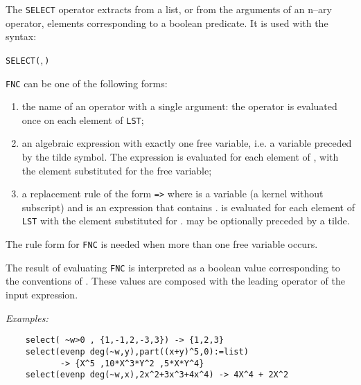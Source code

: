 The \texttt{SELECT} operator extracts from a list,
or from the arguments of an n--ary operator, elements corresponding
to a boolean predicate. It is used with the syntax:
\begin{syntax}
  \texttt{SELECT(},\,\texttt{)}
\end{syntax}

\texttt{FNC} can be one of the following forms:
\begin{enumerate}
\item the name of an operator with a single argument: the operator
is evaluated once on each element of \texttt{LST};
\item an algebraic expression with exactly one free variable, i.e.
a variable preceded by the tilde symbol. The expression
is evaluated for each element of , with the element
substituted for the free variable;
\item a replacement rule of the form  \texttt{=>} 
where  is a variable (a kernel without subscript)
and  is an expression that contains .
 is evaluated for each element of \texttt{LST} with
the element substituted for  .  may be
optionally preceded by a tilde.
\end{enumerate}
The rule form  for \texttt{FNC} is needed when more than
one free variable occurs.

The result of evaluating \texttt{FNC} is
interpreted as a boolean value corresponding to the conventions of
\REDUCE. These values are composed with the leading operator of the
input expression.

\textit{Examples:}\nopagebreak
\begin{verbatim}
    select( ~w>0 , {1,-1,2,-3,3}) -> {1,2,3}
    select(evenp deg(~w,y),part((x+y)^5,0):=list)
           -> {X^5 ,10*X^3*Y^2 ,5*X*Y^4}
    select(evenp deg(~w,x),2x^2+3x^3+4x^4) -> 4X^4 + 2X^2
\end{verbatim}
